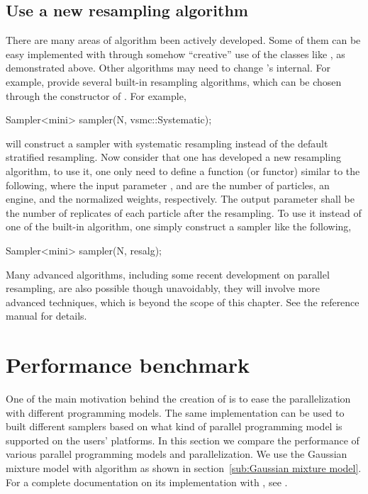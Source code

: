 \subsection{Use a new resampling algorithm}
\label{sub:Use a new resampling algorithm}

There are many areas of \vsmc algorithm been actively developed. Some of them
can be easy implemented with \vsmc through somehow ``creative'' use of the
classes like , as demonstrated above. Other algorithms may
need to change \vsmc's internal. For example, \vsmc provide several built-in
resampling algorithms, which can be chosen through the constructor of
. For example,
\begin{cppcode}
Sampler<mini> sampler(N, vsmc::Systematic);
\end{cppcode}
will construct a sampler with systematic resampling instead of the default
stratified resampling. Now consider that one has developed a new resampling
algorithm, to use it, one only need to define a function (or functor) similar
to the following,
where the input parameter ,  and  are the
number of particles, an \cppoo{} \rng engine, and the normalized weights,
respectively. The output parameter  shall be the number of
replicates of each particle after the resampling. To use it instead of one of
the built-in algorithm, one simply construct a sampler like the following,
\begin{cppcode}
Sampler<mini> sampler(N, resalg);
\end{cppcode}
Many advanced algorithms, including some recent development on parallel
resampling, are also possible though unavoidably, they will involve more
advanced \cpp techniques, which is beyond the scope of this chapter. See the
reference manual for details.

\section{Performance benchmark}
\label{sec:Performance benchmark}

One of the main motivation behind the creation of \vsmc is to ease the
parallelization with different programming models. The same implementation can
be used to built different samplers based on what kind of parallel programming
model is supported on the users' platforms. In this section we compare the
performance of various \smp parallel programming models and \opencl
parallelization. We use the Gaussian mixture model with \smc[2] algorithm
as shown in section~\ref{sub:Gaussian mixture model}. For a complete
documentation on its implementation with \vsmc, see \cite{software:VSMC}.

